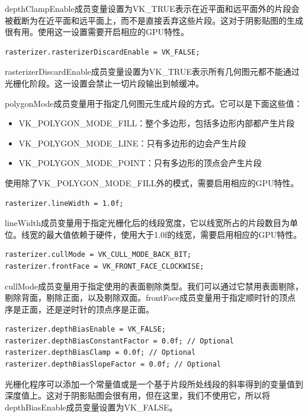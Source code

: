 \documentclass{ctexart}
\begin{document}
depthClampEnable成员变量设置为VK\_TRUE表示在近平面和远平面外的片段会被截断为在近平面和远平面上，而不是直接丢弃这些片段。这对于阴影贴图的生成很有用。使用这一设置需要开启相应的GPU特性。

\begin{lstlisting}[language={[ANSI]C}]
rasterizer.rasterizerDiscardEnable = VK_FALSE;
\end{lstlisting}

rasterizerDiscardEnable成员变量设置为VK\_TRUE表示所有几何图元都不能通过光栅化阶段。这一设置会禁止一切片段输出到帧缓冲。

polygonMode成员变量用于指定几何图元生成片段的方式。它可以是下面这些值：

\begin{itemize}
	\item VK\_POLYGON\_MODE\_FILL：整个多边形，包括多边形内部都产生片段
	\item VK\_POLYGON\_MODE\_LINE：只有多边形的边会产生片段
	\item VK\_POLYGON\_MODE\_POINT：只有多边形的顶点会产生片段
\end{itemize}

使用除了VK\_POLYGON\_MODE\_FILL外的模式，需要启用相应的GPU特性。

\begin{lstlisting}[language={[ANSI]C}]
rasterizer.lineWidth = 1.0f;
\end{lstlisting}

lineWidth成员变量用于指定光栅化后的线段宽度，它以线宽所占的片段数目为单位。线宽的最大值依赖于硬件，使用大于1.0f的线宽，需要启用相应的GPU特性。

\begin{lstlisting}[language={[ANSI]C}]
rasterizer.cullMode = VK_CULL_MODE_BACK_BIT;
rasterizer.frontFace = VK_FRONT_FACE_CLOCKWISE;
\end{lstlisting}

cullMode成员变量用于指定使用的表面剔除类型。我们可以通过它禁用表面剔除，剔除背面，剔除正面，以及剔除双面。frontFace成员变量用于指定顺时针的顶点序是正面，还是逆时针的顶点序是正面。

\begin{lstlisting}[language={[ANSI]C}]
rasterizer.depthBiasEnable = VK_FALSE;
rasterizer.depthBiasConstantFactor = 0.0f; // Optional
rasterizer.depthBiasClamp = 0.0f; // Optional
rasterizer.depthBiasSlopeFactor = 0.0f; // Optional
\end{lstlisting}

光栅化程序可以添加一个常量值或是一个基于片段所处线段的斜率得到的变量值到深度值上。这对于阴影贴图会很有用，但在这里，我们不使用它，所以将depthBiasEnable成员变量设置为VK\_FALSE。
\end{document}

